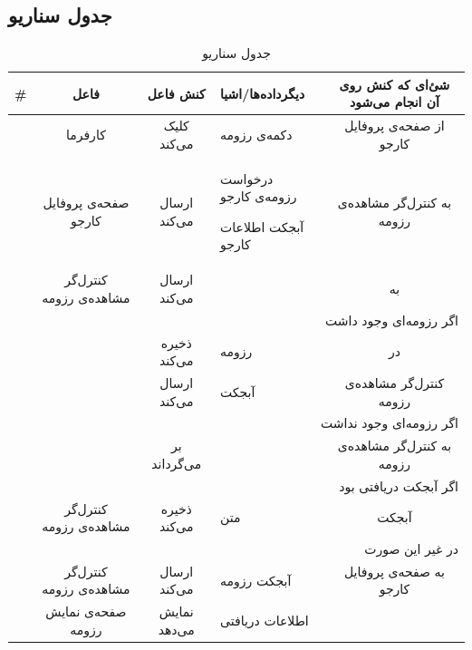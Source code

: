 
\setcounter{MainStepCounter}{0}

\subsection{جدول سناریو}
\begin{table}[H]
	\caption{جدول سناریو }
	\begin{adjustbox}{width=\textwidth}
		\begin{tabular}{|c|c|c|p{}|c|}
			\hline
			\# & فاعل & کنش فاعل & دیگرداده‌ها/اشیا & شئ‌ای که کنش روی آن انجام می‌شود \\
			\hline
			\hline
			\sstep & 
			کارفرما &
			کلیک می‌کند &
			دکمه‌ی رزومه &
			از صفحه‌ی پروفایل کارجو \\
			\hline
			\sstep & 
			صفحه‌ی پروفایل کارجو &
			ارسال می‌کند &
			\begin{inparaitem}
				\item درخواست رزومه‌ی کارجو
				\item آبجکت \json اطلاعات کارجو
			\end{inparaitem} &
			به کنترل‌گر مشاهده‌ی رزومه \\
			\hline
			\sstep & 
			کنترل‌گر مشاهده‌ی رزومه &
			ارسال می‌کند &
			\json &
			به \gdm \\
			\hline
			\sstep & \multicolumn{4}{|r|}{اگر رزومه‌ای وجود داشت} \\
			\hline
			\sstep & 
			\gdm &
			ذخیره می‌کند &
			رزومه &
			در \json\\
			\hline
			\sstep & 
			\gdm &
			ارسال می‌کند &
			آبجکت \json &
			کنترل‌گر مشاهده‌ی رزومه \\
			\hline
			\sstep & \multicolumn{4}{|r|}{اگر رزومه‌ای وجود نداشت}\\
			\hline
			\sstep & 
			\gdm&
			بر می‌گرداند &
			\none&
			به کنترل‌گر مشاهده‌ی رزومه \\
			\hline
			\sstep & \multicolumn{4}{|r|}{اگر آبجکت دریافتی \none بود} \\
			\hline
			\sstep & 
			کنترل‌گر مشاهده‌ی رزومه &
			ذخیره می‌کند &
			متن \say{عدم وجود رزومه}&
			آبجکت \json\\
			\hline
			\sstep & \multicolumn{4}{|r|}{در غیر این صورت} \\
			\hline
			
			\sstep & 
			کنترل‌گر مشاهده‌ی رزومه &
			ارسال می‌کند &
			آبجکت \json رزومه &
			به صفحه‌ی پروفایل کارجو \\
			\hline
			\sstep &
			صفحه‌ی نمایش رزومه &
			نمایش می‌دهد &
			اطلاعات دریافتی &
			\\
			\hline
		\end{tabular}
	\end{adjustbox}
\end{table}
\setcounter{MainStepCounter}{0}
\setcounter{SenarioCounter}{0}
